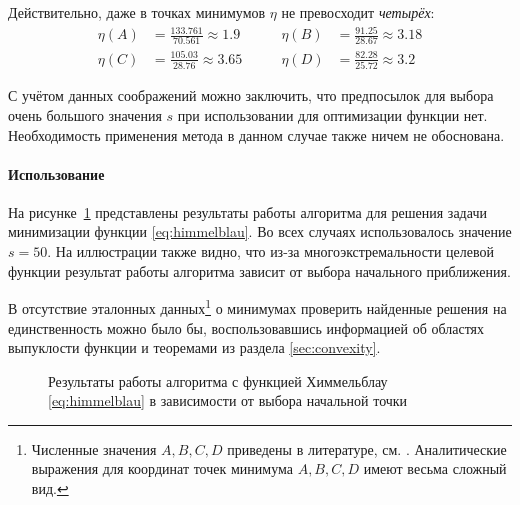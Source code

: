 Действительно, даже в точках минимумов $\eta$ не превосходит
\emph{четырёх}:
\begin{equation}
  \begin{aligned}
    \eta(A) &= \frac{133.761}{70.561} \approx 1.9&\qquad
    \eta(B) &= \frac{91.25}{28.67} \approx 3.18\\ 
    \eta(C) &= \frac{105.03}{28.76} \approx 3.65&\qquad
    \eta(D) &= \frac{82.28}{25.72} \approx 3.2
\end{aligned}
\end{equation}

С учётом данных соображений можно заключить, что предпосылок для
выбора очень большого значения $s$ при использовании \relch{} для
оптимизации функции нет. Необходимость применения метода \gdrelch{} в
данном случае также ничем не обоснована.

\paragraph{Использование \relch{}}

На рисунке \ref{fig:himmelblau} представлены результаты работы
алгоритма \relch{} для решения задачи минимизации функции
\eqref{eq:himmelblau}. Во всех случаях использовалось значение $s=50$.
На иллюстрации также видно, что из-за многоэкстремальности целевой
функции результат работы алгоритма зависит от выбора начального
приближения.

В отсутствие эталонных данных\footnote{Численные значения $A, B, C, D$
  приведены в литературе, см. \cite{himmelblau75}. Аналитические
  выражения для координат точек минимума $A,B,C,D$ имеют весьма
  сложный вид.} о минимумах проверить найденные решения на
единственность можно было бы, воспользовавшись информацией об областях
выпуклости функции и теоремами из раздела \ref{sec:convexity}.

\begin{figure}[thb]
  \centering
  \caption[\relch{} на функции Химмельблау]{Результаты работы
    алгоритма с функцией Химмельблау \eqref{eq:himmelblau} в
    зависимости от выбора начальной точки}
  \label{fig:himmelblau}
\end{figure}
